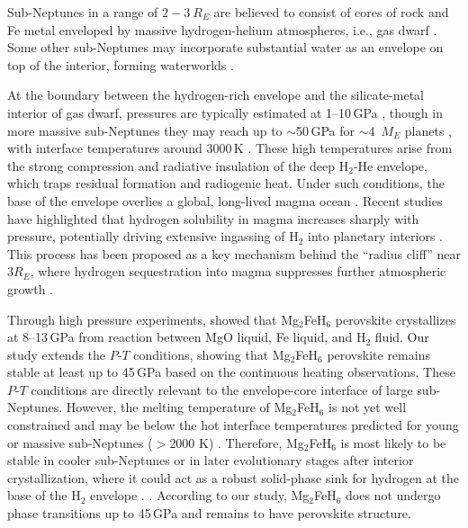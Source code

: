 \documentclass[draft,jgrga,12pt]{agujournal2019}
\begin{document}
Sub-Neptunes in a range of $2{-}3~R_{E}$ are believed to consist of cores of rock and Fe metal enveloped by massive hydrogen-helium atmospheres, i.e., gas dwarf \cite{wolfgang_how_2015, jontof-hutter_secure_2016}.  
Some other sub-Neptunes may incorporate substantial water as an envelope on top of the  interior, forming waterworlds \cite{luque_density_2022, tsiaras_water_2019, benneke_water_2019, burn_radius_2024, venturini_nature_2020}.

At the boundary between the hydrogen-rich envelope and the silicate-metal interior of gas dwarf, pressures are typically estimated at 1--10\,{GPa} \cite{kite_superabundance_2019, kite_atmosphere_2020}, though in more massive sub-Neptunes they may reach up to $\sim$50\,{GPa} for $\sim$4~$M_{E}$ planets \cite{schlichting_chemical_2022}, with interface temperatures around 3000\,K \cite{horn_building_2025}. 
These high temperatures arise from the strong compression and radiative insulation of the deep H$_2$-He envelope, which traps residual formation and radiogenic heat.
Under such conditions, the base of the envelope overlies a global, long-lived magma ocean \cite{vazan_contribution_2018,vazan_rocky_2023, kite_atmosphere_2020, schlichting_chemical_2022}. 
Recent studies have highlighted that hydrogen solubility in magma increases sharply with pressure, potentially driving extensive ingassing of H$_2$ into planetary interiors \cite{hirschmann_solubility_2012, olson_nebular_2019,kimura_predicted_2022, young_phase_2024, gilmore_core_2026}.  
This process has been proposed as a key mechanism behind the ``radius cliff'' near $3R_{E}$, where hydrogen sequestration into magma suppresses further atmospheric growth \cite{kite_superabundance_2019, kim_stability_2023}.

Through high pressure experiments,  showed that Mg$_2$FeH$_6$ perovskite crystallizes at 8--13\,{GPa} from reaction between MgO liquid, Fe liquid, and H$_2$ fluid. 
Our study extends the $P$-$T$ conditions, showing that Mg$_2$FeH$_6$ perovskite remains stable at least up to 45\,{GPa} based on the continuous heating observations.
These $P$-$T$ conditions are directly relevant to the envelope-core interface of large sub-Neptunes. %
However, the melting temperature of Mg$_2$FeH$_6$ is not yet well constrained and may be  below the hot interface temperatures predicted for young or massive sub-Neptunes ($>$2000 K) \cite{kite_atmosphere_2020}. 
Therefore,  Mg$_2$FeH$_6$ is most likely to be stable in cooler sub-Neptunes or in later evolutionary stages after interior crystallization, where it could act as a robust solid-phase sink for hydrogen at the base of the H$_2$ envelope \cite{kim_stability_2023}. 
 \addcite.  
According to our study, Mg$_2$FeH$_6$ does not undergo phase transitions up to 45\,{GPa} and remains to have perovskite structure. 
\end{document}
